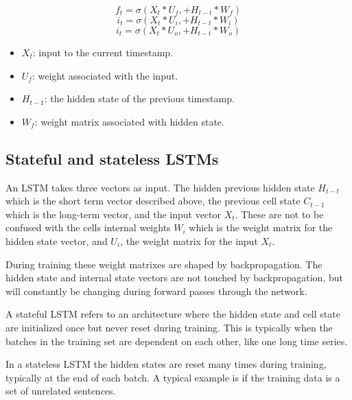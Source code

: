 \begin{equation}
  f_t = \sigma (X_t * U_f, + H_{t-t} * W_f)
  \label{eq:lstm:forget-gate}
\end{equation}
\begin{equation}
  i_t = \sigma (X_t * U_i, + H_{t-t} * W_i)
  \label{eq:lstm:input_gate}
\end{equation}
\begin{equation}
  i_t = \sigma (X_t * U_o, + H_{t-t} * W_o)
  \label{eq:lstm:output-gate}
\end{equation}
\begin{itemize}
  \item $X_t$: input to the current timestamp.
  \item $U_f$: weight associated with the input.
  \item $H_{t-1}$: the hidden state of the previous timestamp.
  \item $W_f$: weight matrix associated with hidden state.
\end{itemize}






\subsection*{Stateful and stateless LSTMs}
\label{section:BT:stateful-vs-stateless}
An LSTM takes three vectors as input. The hidden previous hidden state $H_{t-t}$
which is the short term vector described above, the previous cell state
$C_{t-1}$ which is the long-term vector, and the input vector $X_t$.
These are not to be confused with the cells internal weights $W_i$
which is the weight matrix for the hidden state vector, and $U_i$,
the weight matrix for the input $X_t$.

During training these weight matrixes are shaped by backpropagation.
The hidden state and internal state vectors are not touched by backpropagation,
but will constantly be changing during forward passes through the network.

A stateful LSTM refers to an architecture where the hidden state and cell state
are initialized once but never reset during training. This is typically
when the batches in the training set are dependent on each other, like
one long time series.

In a stateless LSTM the hidden states are reset many times during training,
typically at the end of each batch. A typical example is if the training
data is a set of unrelated sentences.


